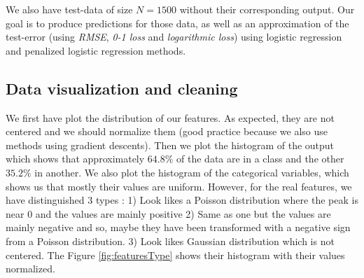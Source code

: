 \documentclass{article} %
\begin{document}
We also have test-data of size $N=1500$ without their corresponding output. Our goal is to produce predictions for those data, as well as an approximation of the test-error (using \textit{RMSE}, \textit{0-1 loss} and \textit{logarithmic loss}) using logistic regression and penalized logistic regression methods.

\subsection{Data visualization and cleaning}
\begin{figure}
\center
{}
\hfill
{}
\caption{}
\end{figure}

We first have plot the distribution of our features. As expected, they are not centered and we should normalize them (good practice because we also use methods using gradient descents). Then we plot the histogram of the output which shows that approximately $64.8\%$ of the data are in a class and the other $35.2\%$ in another. We also plot the histogram of the categorical variables, which shows us that mostly their values are uniform. However, for the real features, we have distinguished 3 types : 1) Look likes a Poisson distribution where the peak is near 0 and the values are mainly positive 2) Same as one but the values are mainly negative and so, maybe they have been transformed with a negative sign from a Poisson distribution. 3) Look likes Gaussian distribution which is not centered. The Figure \ref{fig:featuresType} shows their histogram with their values normalized.
\end{document}
